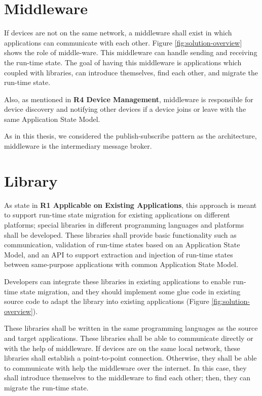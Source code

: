 \section{Middleware}
If devices are not on the same network, a middleware shall exist in which applications can communicate with each other. Figure \ref{fig:solution-overview} shows the role of middle-ware.
This middleware can handle sending and receiving the run-time state.
The goal of having this middleware is applications which coupled with
libraries, can introduce themselves, find each other, and migrate the run-time state.

Also, as mentioned in \textbf{R4 Device Management}, middleware is responsible for device discovery and notifying other devices if a device joins or leave with the same Application State Model.

As in this thesis, we considered the publish-subscribe pattern as the architecture, middleware is the intermediary message broker.

\section{Library}
As state in \textbf{R1 Applicable on Existing Applications}, this approach is meant to support run-time state migration for existing applications on different platforms; special libraries in different programming languages and platforms shall be developed. 
These libraries shall provide basic functionality such as communication, validation of run-time states based on an Application State Model, and an API to support extraction and injection of run-time states between same-purpose applications with common Application State Model.

Developers can integrate these libraries in existing applications to enable run-time state migration, and they should implement some glue code in existing source code to adapt the library into existing applications (Figure \ref{fig:solution-overview}).

These libraries shall be written in the same programming languages as the source and target applications. These libraries shall be able to communicate directly or with the help of middleware.
If devices are on the same local network, these libraries shall establish a point-to-point connection.
Otherwise, they shall be able to communicate with help the middleware over the internet.
In this case, they shall introduce themselves to the middleware to find each other; then, they can migrate the run-time state.


